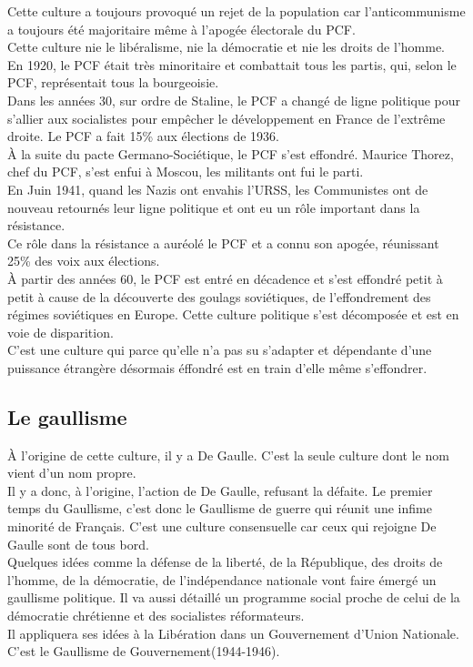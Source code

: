 \documentclass[12pt, a4paper, openany]{book}
\begin{document}
Cette culture a toujours provoqué un rejet de la population car l'anticommunisme a toujours été majoritaire même à l'apogée électorale du PCF. \\
Cette culture nie le libéralisme, nie la démocratie et nie les droits de l'homme. \\
En 1920, le PCF était très minoritaire et combattait tous les partis, qui, selon le PCF, représentait tous la bourgeoisie. \\
Dans les années 30, sur ordre de Staline, le PCF a changé de ligne politique pour s'allier aux socialistes pour empêcher le développement en France de l'extrême droite. Le PCF a fait 15\% aux élections de 1936. \\
À la suite du pacte Germano-Sociétique, le PCF s'est effondré. Maurice Thorez, chef du PCF, s'est enfui à Moscou, les militants ont fui le parti. \\
En Juin 1941, quand les Nazis ont envahis l'URSS, les Communistes ont de nouveau retournés leur ligne politique et ont eu un rôle important dans la résistance. \\
Ce rôle dans la résistance a auréolé le PCF et a connu son apogée, réunissant 25\% des voix aux élections. \\
À partir des années 60, le PCF est entré en décadence et s'est effondré petit à petit à cause de la découverte des goulags soviétiques, de l'effondrement des régimes soviétiques en Europe. Cette culture politique s'est décomposée et est en voie de disparition. \\
C'est une culture qui parce qu'elle n'a pas su s'adapter et dépendante d'une puissance étrangère désormais éffondré est en train d'elle même s'effondrer.

\subsection{Le gaullisme}

À l'origine de cette culture, il y a De Gaulle. C'est la seule culture dont le nom vient d'un nom propre. \\
Il y a donc, à l'origine, l'action de De Gaulle, refusant la défaite. Le premier temps du Gaullisme, c'est donc le Gaullisme de guerre qui réunit une infime minorité de Français. C'est une culture consensuelle car ceux qui rejoigne De Gaulle sont de tous bord. \\
Quelques idées comme la défense de la liberté, de la République, des droits de l'homme, de la démocratie, de l'indépendance nationale vont faire émergé un gaullisme politique. Il va aussi détaillé un programme social proche de celui de la démocratie chrétienne et des socialistes réformateurs. \\
Il appliquera ses idées à la Libération dans un Gouvernement d'Union Nationale. C'est le Gaullisme de Gouvernement(1944-1946).
\end{document}
